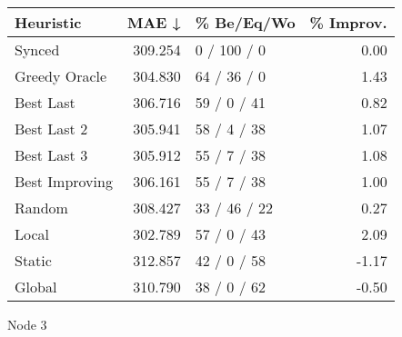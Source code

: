 \begin{tabular}{lrlr}
\toprule
\textbf{Heuristic} & \textbf{MAE ↓} & \textbf{\% Be/Eq/Wo} & \textbf{\% Improv.} \\
\midrule
            Synced &        309.254 &          0 / 100 / 0 &                0.00 \\
     Greedy Oracle &        304.830 &          64 / 36 / 0 &                1.43 \\
         Best Last &        306.716 &          59 / 0 / 41 &                0.82 \\
       Best Last 2 &        305.941 &          58 / 4 / 38 &                1.07 \\
       Best Last 3 &        305.912 &          55 / 7 / 38 &                1.08 \\
    Best Improving &        306.161 &          55 / 7 / 38 &                1.00 \\
            Random &        308.427 &         33 / 46 / 22 &                0.27 \\
             Local &        302.789 &          57 / 0 / 43 &                2.09 \\
            Static &        312.857 &          42 / 0 / 58 &               -1.17 \\
            Global &        310.790 &          38 / 0 / 62 &               -0.50 \\
\bottomrule
\end{tabular}
\caption{Node 3}
\label{tab:iid_lr01_le2_bs2_3}
